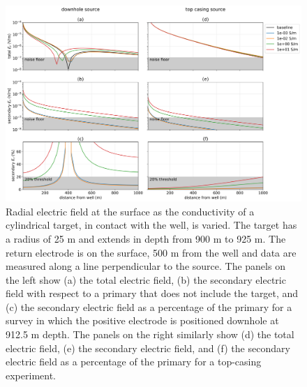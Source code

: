 \begin{figure}
    \begin{center}
    \includegraphics[width=\textwidth]{figures/dc_casing/target_electric_fields.png}
    \end{center}
\caption{
    Radial electric field at the surface as the conductivity of a cylindrical target, in contact with the well,
    is varied. The target has a radius of 25 m and extends in depth from 900 m to 925 m. The return electrode
    is on the surface, 500 m from the well and data are measured along a line perpendicular to the source.
    The panels on the left show
    (a) the total electric field, (b) the secondary electric field with respect to a primary that does not include the target,
    and (c) the secondary electric field as a percentage of the primary for a survey in which the positive electrode is
    positioned downhole at 912.5 m depth. The panels on the right similarly show (d) the total electric field, (e) the
    secondary electric field, and (f) the secondary electric field as a percentage of the primary for a top-casing experiment.
}
\label{fig:target_electric_fields}
\end{figure}
